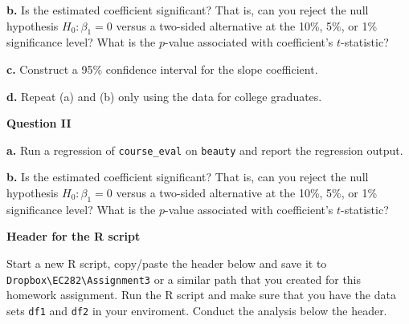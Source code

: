 \documentclass[
]{book}
\begin{document}
\textbf{b.} Is the estimated coefficient significant? That is, can you reject the null hypothesis \(H_0: \beta_1 = 0\) versus a two-sided alternative at the 10\%, 5\%, or 1\% significance level? What is the \(p\)-value associated with coefficient's \(t\)-statistic?

\textbf{c.} Construct a 95\% confidence interval for the slope coefficient.

\textbf{d.} Repeat (a) and (b) only using the data for college graduates.

\textbf{Question II}

\textbf{a.} Run a regression of \texttt{course\_eval} on \texttt{beauty} and report the regression output.

\textbf{b.} Is the estimated coefficient significant? That is, can you reject the null hypothesis \(H_0: \beta_1 = 0\) versus a two-sided alternative at the 10\%, 5\%, or 1\% significance level? What is the \(p\)-value associated with coefficient's \(t\)-statistic?

\textbf{Header for the R script}

Start a new R script, copy/paste the header below and save it to \texttt{Dropbox\textbackslash{}EC282\textbackslash{}Assignment3} or a similar path that you created for this homework assignment. Run the R script and make sure that you have the data sets \texttt{df1} and \texttt{df2} in your enviroment. Conduct the analysis below the header.
\end{document}
